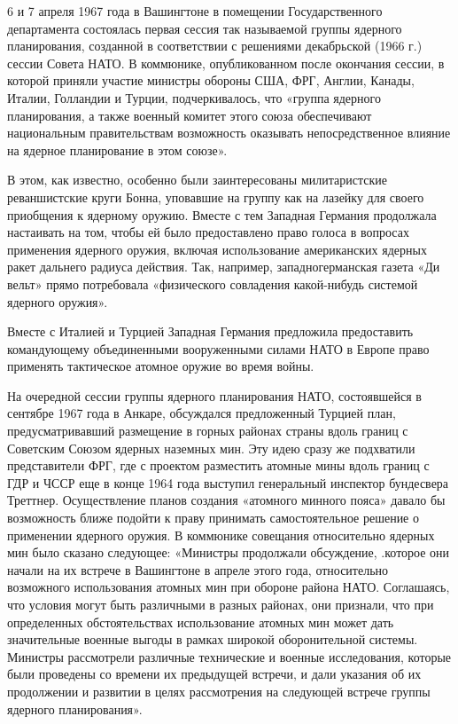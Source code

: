 \documentclass[12pt, a4paper, openany]{book}
\begin{document}
	6 и 7 апреля 1967 года в Вашингтоне в помещении Государственного департамента состоялась первая сессия так называемой группы ядерного планирования, созданной в соответствии с решениями декабрьской (1966 г.) сессии Совета НАТО. В коммюнике, опубликованном после окончания сессии, в которой приняли участие министры обороны США, ФРГ, Англии, Канады, Италии, Голландии и Турции, подчеркивалось, что «группа ядерного планирования, а также военный комитет этого союза обеспечивают национальным правительствам возможность оказывать непосредственное влияние на ядерное планирование в этом союзе».
	
	В этом, как известно, особенно были заинтересованы милитаристские реваншистские круги Бонна, уповавшие на группу как на лазейку для своего приобщения к ядерному оружию. Вместе с тем Западная Германия продолжала настаивать на том, чтобы ей было предоставлено право голоса в вопросах применения ядерного оружия, включая использование американских ядерных ракет дальнего радиуса действия. Так, например, западногерманская газета «Ди вельт» прямо потребовала «физического совладения какой-нибудь системой ядерного оружия».
	
	Вместе с Италией и Турцией Западная Германия предложила предоставить командующему объединенными вооруженными силами НАТО в Европе право применять тактическое атомное оружие во время войны.
	
	На очередной сессии группы ядерного планирования НАТО, состоявшейся в сентябре 1967 года в Анкаре, обсуждался предложенный Турцией план, предусматривавший размещение в горных районах страны вдоль границ с Советским Союзом ядерных наземных мин. Эту идею сразу же подхватили представители ФРГ, где с проектом разместить атомные мины вдоль границ с ГДР и ЧССР еще в конце 1964 года выступил генеральный инспектор бундесвера Треттнер. Осуществление планов создания «атомного минного пояса» давало бы возможность ближе подойти к праву принимать самостоятельное решение о применении ядерного оружия. В коммюнике совещания относительно ядерных мин было сказано следующее: «Министры продолжали обсуждение, .которое они начали на их встрече в Вашингтоне в апреле этого года, относительно возможного использования атомных мин при обороне района НАТО. Соглашаясь, что условия могут быть различными в разных районах, они признали, что при определенных обстоятельствах использование атомных мин может дать значительные военные выгоды в рамках широкой оборонительной системы. Министры рассмотрели различные технические и военные исследования, которые были проведены со времени их предыдущей встречи, и дали указания об их продолжении и развитии в целях рассмотрения на следующей встрече группы ядерного планирования».
	
\end{document}
